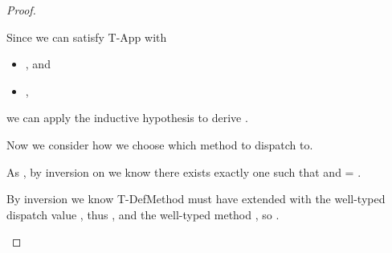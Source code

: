 \begin{lemma}
\begin{proof}
\begin{case}[B-BetaMulti]
\begin{itemize}
\begin{subcase}[T-App]
         Since we can satisfy T-App with
       \begin{itemize}
         \item
         , and
         \item
  \judgementrewrite {\propenv{}} {} {\s{}}
             {
                         {}}
                       {}
                       {},
       \end{itemize}
       we can apply the inductive hypothesis
       to derive
  \judgementrewrite {\propenv{}} {} 
  {
              {}
              {\x{}}}
             {
                         {}
                         {\x{}}}
                       {\replacefor
                         {}
                         {}
                         {\x{}}}
                       {}.

 Now we consider how we choose which method to dispatch to.

 As 
  \getmethod {\disptable{}}
             {}
             {}
             {}, by inversion on \getmethodliteral
             we know
   there exists exactly one  such that 
    and  = {\true{}}.

   By inversion we know T-DefMethod must have extended \disptable{} 
   with the well-typed dispatch value ,
   thus {}, and
   the well-typed method ,
   so {}.


\end{subcase}
\end{itemize}
\end{case}
\end{proof}
\end{lemma}
